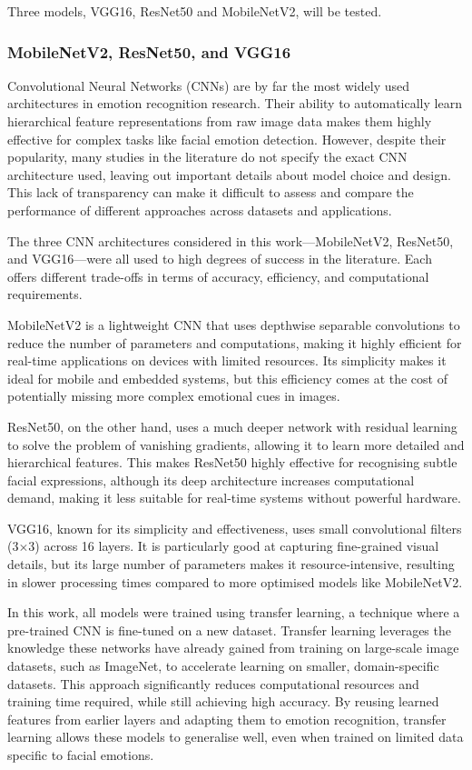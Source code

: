 Three models, VGG16, ResNet50 and MobileNetV2, will be tested.

\subsubsection{MobileNetV2, ResNet50, and VGG16}

Convolutional Neural Networks (CNNs) are by far the most widely used architectures in emotion recognition research. Their ability to automatically learn hierarchical feature representations from raw image data makes them highly effective for complex tasks like facial emotion detection. However, despite their popularity, many studies in the literature do not specify the exact CNN architecture used, leaving out important details about model choice and design. This lack of transparency can make it difficult to assess and compare the performance of different approaches across datasets and applications.

The three CNN architectures considered in this work—MobileNetV2, ResNet50, and VGG16—were all used to high degrees of success in the literature. Each offers different trade-offs in terms of accuracy, efficiency, and computational requirements.

MobileNetV2 is a lightweight CNN that uses depthwise separable convolutions to reduce the number of parameters and computations, making it highly efficient for real-time applications on devices with limited resources. Its simplicity makes it ideal for mobile and embedded systems, but this efficiency comes at the cost of potentially missing more complex emotional cues in images.

ResNet50, on the other hand, uses a much deeper network with residual learning to solve the problem of vanishing gradients, allowing it to learn more detailed and hierarchical features. This makes ResNet50 highly effective for recognising subtle facial expressions, although its deep architecture increases computational demand, making it less suitable for real-time systems without powerful hardware.

VGG16, known for its simplicity and effectiveness, uses small convolutional filters (3\(\times\)3) across 16 layers. It is particularly good at capturing fine-grained visual details, but its large number of parameters makes it resource-intensive, resulting in slower processing times compared to more optimised models like MobileNetV2.

In this work, all models were trained using transfer learning, a technique where a pre-trained CNN is fine-tuned on a new dataset. Transfer learning leverages the knowledge these networks have already gained from training on large-scale image datasets, such as ImageNet, to accelerate learning on smaller, domain-specific datasets. This approach significantly reduces computational resources and training time required, while still achieving high accuracy. By reusing learned features from earlier layers and adapting them to emotion recognition, transfer learning allows these models to generalise well, even when trained on limited data specific to facial emotions.
